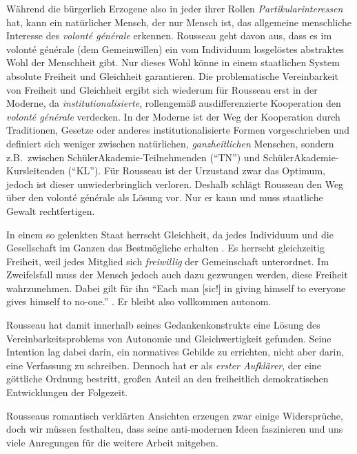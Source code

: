 Während die bürgerlich Erzogene also in jeder ihrer Rollen \emph{Partikularinteressen} hat, kann ein natürlicher Mensch, der nur Mensch ist, das allgemeine menschliche Interesse des \emph{volonté générale} erkennen.
Rousseau geht davon aus, dass es im volonté générale (dem Gemeinwillen) ein vom Individuum losgelöstes abstraktes Wohl der Menschheit gibt.
Nur dieses Wohl könne in einem staatlichen System absolute Freiheit und Gleichheit garantieren.
Die problematische Vereinbarkeit von Freiheit und Gleichheit ergibt sich wiederum für Rousseau erst in der Moderne, da \emph{institutionalisierte}, rollengemäß ausdifferenzierte Kooperation den \emph{volonté générale} verdecken.
In der Moderne ist der Weg der Kooperation durch Traditionen, Gesetze oder anderes institutionalisierte Formen vorgeschrieben und definiert sich weniger zwischen natürlichen, \emph{ganzheitlichen} Menschen, sondern z.B.\ zwischen SchülerAkademie-Teilnehmenden (``TN'') und SchülerAkademie-Kursleitenden (``KL'').
Für Rousseau ist der Urzustand zwar das Optimum, jedoch ist dieser unwiederbringlich verloren.
Deshalb schlägt Rousseau den Weg über den volonté générale als Lösung vor.
Nur er kann und muss staatliche Gewalt rechtfertigen.

In einem so gelenkten Staat herrscht Gleichheit, da jedes Individuum und die Gesellschaft im Ganzen das Bestmögliche erhalten \parencite[7]{Rousseau-1762-b}.
Es herrscht gleichzeitig Freiheit, weil jedes Mitglied sich \emph{freiwillig} der Gemeinschaft unterordnet.
Im Zweifelsfall muss der Mensch jedoch auch dazu gezwungen werden, diese Freiheit wahrzunehmen.
Dabei gilt für ihn ``Each man [sic!] in giving himself to everyone gives himself to no-one.'' \parencite[7]{Rousseau-1762-b}.
Er bleibt also vollkommen autonom.

Rousseau hat damit innerhalb seines Gedankenkonstrukts eine Lösung des Vereinbarkeitsproblems von Autonomie und Gleichwertigkeit gefunden.
Seine Intention lag dabei darin, ein normatives Gebilde zu errichten, nicht aber darin, eine Verfassung zu schreiben.
Dennoch hat er als \emph{erster Aufklärer}, der eine göttliche Ordnung bestritt, großen Anteil an den freiheitlich demokratischen Entwicklungen der Folgezeit.

Rousseaus romantisch verklärten Ansichten erzeugen zwar einige Widersprüche, doch wir müssen festhalten, dass seine anti-modernen Ideen faszinieren und uns viele Anregungen für die weitere Arbeit mitgeben.
